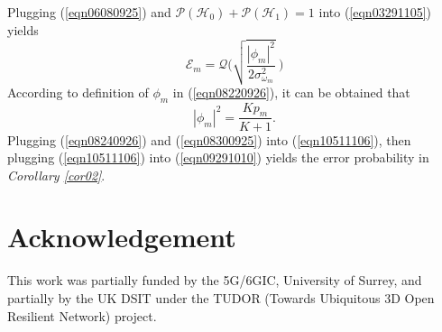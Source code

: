 \documentclass[conference, a4paper]{IEEEtran}
\newcommand{\corref}[1]{{\it Corollary \ref{#1}}}
\renewcommand{\eqref}[1]{(\ref{#1})}
\begin{document}
Plugging \eqref{eqn06080925} and $\mathcal{P}(\mathcal{H}_{0}) + \mathcal{P}(\mathcal{H}_{1}) =1$ into \eqref{eqn03291105} yields
\begin{equation} \label{eqn10511106}
	\mathscr{E}_{m}=\mathcal{Q}\bigg(\sqrt{\frac{|\phi_m|^2}{2\sigma_{\omega_{m}}^{2}}}\ \bigg)
\end{equation}
According to definition of $\phi_{m}$ in \eqref{eqn08220926}, it can be obtained that
\begin{equation} \label{eqn08240926}
	|\phi_{m}|^{2} =\dfrac{Kp_{m}}{K + 1}.
\end{equation}
Plugging \eqref{eqn08240926} and \eqref{eqn08300925} into \eqref{eqn10511106}, then plugging \eqref{eqn10511106} into \eqref{eqn09291010} yields the error probability in \corref{cor02}.

\section*{Acknowledgement}
This work was partially funded by the 5G/6GIC, University of Surrey, and partially by the UK DSIT under the TUDOR (Towards Ubiquitous 3D Open Resilient Network) project.

\ifCLASSOPTIONcaptionsoff
\newpage
\fi

\balance

 
\end{document}
